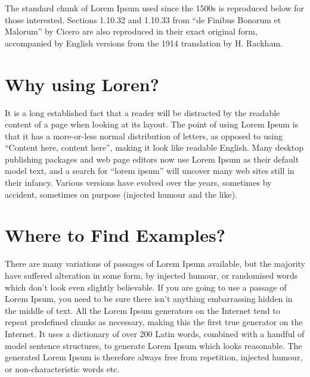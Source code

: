 The standard chunk of Lorem Ipsum used since the 1500s is reproduced
below for those interested.
Sections 1.10.32 and 1.10.33 from ``de Finibus Bonorum et Malorum'' by
Cicero are also reproduced in their exact original form, accompanied
by English versions from the 1914 translation by H. Rackham.

\section{Why using Loren?}

It is a long established fact that a reader will be distracted by the
readable content of a page when looking at its layout.
The point of using Lorem Ipsum is that it has a more-or-less normal
distribution of letters, as opposed to using ``Content here, content
here'', making it look like readable English.
Many desktop publishing packages and web page editors now use Lorem
Ipsum as their default model text, and a search for ``lorem ipsum''
will uncover many web sites still in their infancy.
Various versions have evolved over the years, sometimes by accident,
sometimes on purpose (injected humour and the like).  

\section{Where to Find Examples?}

There are many variations of passages of Lorem Ipsum available, but
the majority have suffered alteration in some form, by injected
humour, or randomised words which don't look even slightly
believable.
If you are going to use a passage of Lorem Ipsum, you need to be sure
there isn't anything embarrassing hidden in the middle of text.
All the Lorem Ipsum generators on the Internet tend to repeat
predefined chunks as necessary, making this the first true generator 
on the Internet.
It uses a dictionary of over 200 Latin words, combined with a handful
of model sentence structures, to generate Lorem Ipsum which looks
reasonable.
The generated Lorem Ipsum is therefore always free from repetition,
injected humour, or non-characteristic words etc. 
